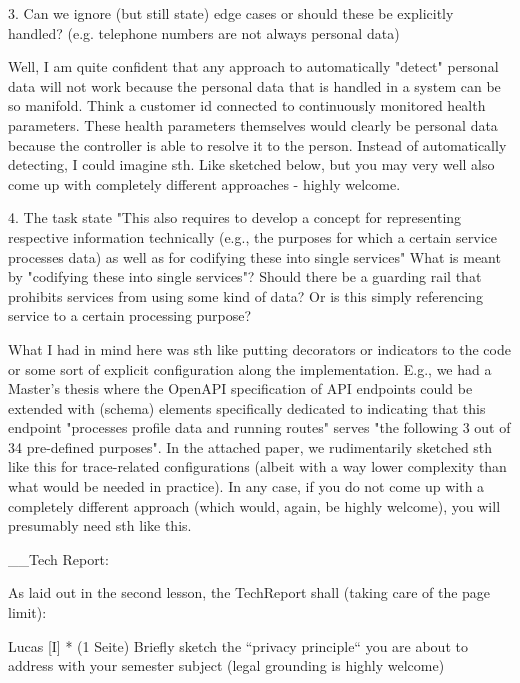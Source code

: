     3. Can we ignore (but still state) edge cases or should these be explicitly handled? (e.g. telephone numbers are not always personal data)

Well, I am quite confident that any approach to automatically "detect" personal data will not work because the personal data that is handled in a system can be so manifold. Think a customer id connected to continuously monitored health parameters. These health parameters themselves would clearly be personal data because the controller is able to resolve it to the person. Instead of automatically detecting, I could imagine sth. Like sketched below, but you may very well also come up with completely different approaches - highly welcome.

    4. The task state "This also requires to develop a concept for representing respective information technically (e.g., the purposes for which a certain service processes data) as well as for codifying these into single services"
    What is meant by "codifying these into single services"? Should there be a guarding rail that prohibits services from using some kind of data? Or is this simply referencing service to a certain processing purpose?

What I had in mind here was sth like putting decorators or indicators to the code or some sort of explicit configuration along the implementation. E.g., we had a Master's thesis where the OpenAPI specification of API endpoints could be extended with (schema) elements specifically dedicated to indicating that this endpoint "processes profile data and running routes" serves "the following 3 out of 34 pre-defined purposes". In the attached paper, we rudimentarily sketched sth like this for trace-related configurations (albeit with a way lower complexity than what would be needed in practice). In any case, if you do not come up with a completely different approach (which would, again, be highly welcome), you will presumably need sth like this.





__Tech Report: 

As laid out in the second lesson, the TechReport shall (taking care of the page limit):

Lucas
[I] * (1 Seite) 
Briefly sketch the “privacy principle“ you are about to address with your semester subject (legal grounding is highly welcome)  




